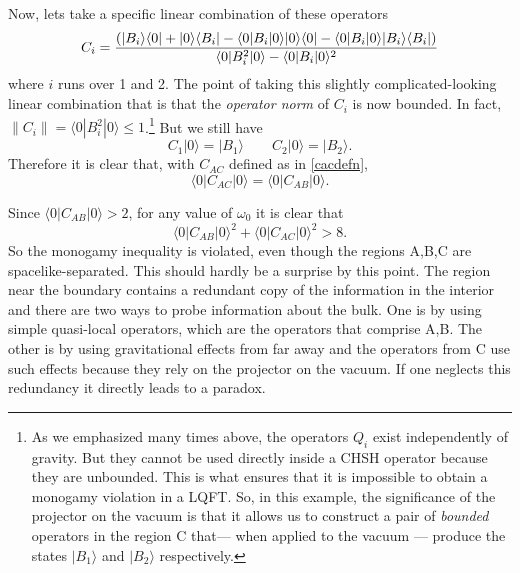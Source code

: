 \documentclass[12pt]{article}
\newcommand{\be}{\begin{equation}}
\newcommand{\ee}{\end{equation}}
\begin{document}
Now, lets take a specific linear combination of these operators
\be
\label{cicomb}
C_i = {\left(|B_i \rangle \langle 0| + |0 \rangle \langle B_i |  - \langle 0 | B_i | 0 \rangle |0 \rangle \langle 0|  - \langle 0 | B_i | 0 \rangle |B_i \rangle \langle B_i| \right) \over \langle 0 | B_i^2 | 0 \rangle - \langle 0| B_i| 0 \rangle^2}
\ee
where $i$ runs over 1 and 2. The point of taking this slightly complicated-looking linear combination that is that the {\em operator norm} of $C_i$ is now bounded.  In fact, $\|C_i \| = \langle 0 | B_i^2 | 0 \rangle \leq 1$.\footnote{As we emphasized many times above, the operators $Q_i$ exist independently of gravity. But they cannot be used directly inside a CHSH operator because they are unbounded. This is what ensures that it is impossible to obtain a monogamy violation in a LQFT. So, in this example, the significance of the projector on the vacuum is that it allows us to construct a pair of {\em bounded} operators in the region C that--- when applied to the vacuum --- produce the states $|B_1 \rangle$ and $|B_2 \rangle$ respectively.}  But we still have
\be
C_1 | 0 \rangle = |B_1\rangle \qquad C_2 | 0 \rangle = |B_2 \rangle.
\ee
Therefore it is clear that, with $C_{AC}$ defined as in \eqref{cacdefn},
\be
\langle 0 | C_{A C} | 0 \rangle = \langle 0 | C_{AB} | 0 \rangle.
\ee




Since $\langle 0 | C_{AB} | 0 \rangle > 2$, for any value of $\omega_0$ it is clear that
\be
\langle 0 | C_{AB} | 0 \rangle^2 + \langle 0| C_{AC} | 0 \rangle^2 > 8.
\ee
So the monogamy inequality is violated, even though the regions A,B,C are spacelike-separated.
This should hardly be a surprise by this point. The region near the boundary contains a redundant copy of the information in the interior and there are two ways to probe information about the bulk. One is by using simple quasi-local operators, which are the operators that comprise A,B. The other is by using gravitational effects from far away and the operators from C use such effects because they rely on the projector on the vacuum. If one neglects this redundancy it directly leads to a paradox.
\end{document}
